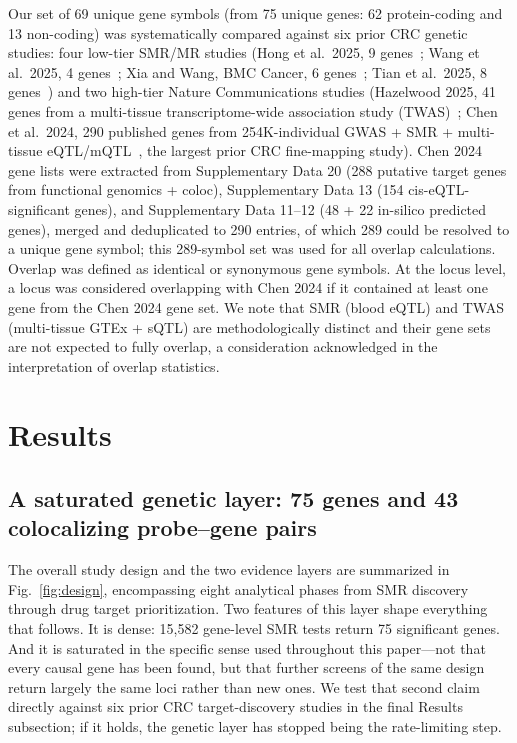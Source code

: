 \documentclass[11pt,a4paper]{article}
\begin{document}
Our set of 69 unique gene symbols (from 75 unique genes: 62 protein-coding
and 13 non-coding) was systematically
compared against six prior CRC genetic studies: four low-tier SMR/MR studies
(Hong et al.~2025, 9 genes~\cite{hong2025integrative}; Wang et al.~2025, 4
genes~\cite{wang2025discovoncol}; Xia and Wang, BMC Cancer, 6
genes~\cite{xia2025bmccancer}; Tian et al.~2025, 8 genes~\cite{tian2025dbi}) and two high-tier Nature Communications studies (Hazelwood
2025, 41 genes from a multi-tissue transcriptome-wide association
study (TWAS)~\cite{hazelwood2025multi}; Chen et
al.~2024, 290 published genes from 254K-individual GWAS + SMR + multi-tissue
eQTL/mQTL~\cite{chen2024integrative}, the largest prior CRC fine-mapping study).
Chen 2024 gene lists were extracted from Supplementary Data 20 (288 putative
target genes from functional genomics + coloc), Supplementary Data 13 (154
cis-eQTL-significant genes), and Supplementary Data 11--12 (48 + 22 in-silico
predicted genes), merged and deduplicated to 290 entries, of which 289 could be resolved to a unique
gene symbol; this 289-symbol set was used for all overlap calculations. Overlap
was defined as identical or synonymous gene symbols. At the locus level, a
locus was considered overlapping with Chen 2024 if it contained at least one gene
from the Chen 2024 gene set. We note that SMR (blood eQTL) and TWAS (multi-tissue
GTEx + sQTL) are methodologically distinct and their gene sets are not expected
to fully overlap, a consideration acknowledged in the interpretation of overlap
statistics.



\section{Results}

\subsection{A saturated genetic layer: 75 genes and 43 colocalizing probe--gene pairs}

The overall study design and the two evidence layers are summarized in
Fig.~\ref{fig:design}, encompassing eight analytical phases from SMR discovery
through drug target prioritization. Two features of this layer shape everything that follows. It is dense: 15,582 gene-level SMR tests return 75 significant genes. And it is saturated in the specific sense used throughout this paper—not that every causal gene has been found, but that further screens of the same design return largely the same loci rather than new ones. We test that second claim directly against six prior CRC target-discovery studies in the final Results subsection; if it holds, the genetic layer has stopped being the rate-limiting step.
\end{document}
